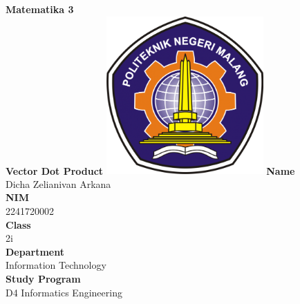 \documentclass[12pt,titlepage]{article}
\newcommand{\vSubject}{Matematika 3}
\newcommand{\vSubtitle}{Vector Dot Product}
\newcommand{\vName}{Dicha Zelianivan Arkana}
\newcommand{\vNIM}{2241720002}
\newcommand{\vClass}{2i}
\newcommand{\vDepartment}{Information Technology}
\newcommand{\vStudyProgram}{D4 Informatics Engineering}
\begin{document}
\begin{titlepage}
    \centering
    \vfill
    {\bfseries\LARGE
        \vSubject\\
        \vskip0.25cm
        \vSubtitle
    }
    \vfill
    \includegraphics[width=6cm]{images/polinema-logo.png}
    \vfill
    {
        \textbf{Name}\\
        \vName\\
        \vskip0.5cm
        \textbf{NIM}\\
        \vNIM\\
        \vskip0.5cm
        \textbf{Class}\\
        \vClass\\
        \vskip0.5cm
        \textbf{Department}\\
        \vDepartment\\
        \vskip0.5cm
        \textbf{Study Program}\\
        \vStudyProgram
    }
\end{titlepage}
\end{document}
